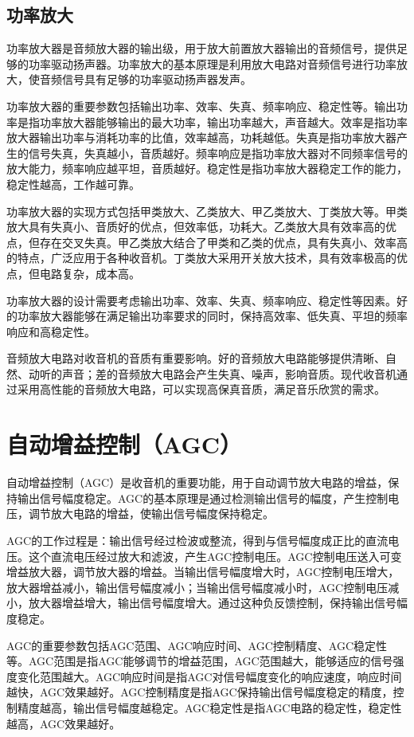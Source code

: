 \documentclass[12pt,UTF8]{ctexbook}
\begin{document}
\subsection{功率放大}

功率放大器是音频放大器的输出级，用于放大前置放大器输出的音频信号，提供足够的功率驱动扬声器。功率放大的基本原理是利用放大电路对音频信号进行功率放大，使音频信号具有足够的功率驱动扬声器发声。

功率放大器的重要参数包括输出功率、效率、失真、频率响应、稳定性等。输出功率是指功率放大器能够输出的最大功率，输出功率越大，声音越大。效率是指功率放大器输出功率与消耗功率的比值，效率越高，功耗越低。失真是指功率放大器产生的信号失真，失真越小，音质越好。频率响应是指功率放大器对不同频率信号的放大能力，频率响应越平坦，音质越好。稳定性是指功率放大器稳定工作的能力，稳定性越高，工作越可靠。

功率放大器的实现方式包括甲类放大、乙类放大、甲乙类放大、丁类放大等。甲类放大具有失真小、音质好的优点，但效率低，功耗大。乙类放大具有效率高的优点，但存在交叉失真。甲乙类放大结合了甲类和乙类的优点，具有失真小、效率高的特点，广泛应用于各种收音机。丁类放大采用开关放大技术，具有效率极高的优点，但电路复杂，成本高。

功率放大器的设计需要考虑输出功率、效率、失真、频率响应、稳定性等因素。好的功率放大器能够在满足输出功率要求的同时，保持高效率、低失真、平坦的频率响应和高稳定性。

音频放大电路对收音机的音质有重要影响。好的音频放大电路能够提供清晰、自然、动听的声音；差的音频放大电路会产生失真、噪声，影响音质。现代收音机通过采用高性能的音频放大电路，可以实现高保真音质，满足音乐欣赏的需求。

\section{自动增益控制（AGC）}

自动增益控制（AGC）是收音机的重要功能，用于自动调节放大电路的增益，保持输出信号幅度稳定。AGC的基本原理是通过检测输出信号的幅度，产生控制电压，调节放大电路的增益，使输出信号幅度保持稳定。

AGC的工作过程是：输出信号经过检波或整流，得到与信号幅度成正比的直流电压。这个直流电压经过放大和滤波，产生AGC控制电压。AGC控制电压送入可变增益放大器，调节放大器的增益。当输出信号幅度增大时，AGC控制电压增大，放大器增益减小，输出信号幅度减小；当输出信号幅度减小时，AGC控制电压减小，放大器增益增大，输出信号幅度增大。通过这种负反馈控制，保持输出信号幅度稳定。

AGC的重要参数包括AGC范围、AGC响应时间、AGC控制精度、AGC稳定性等。AGC范围是指AGC能够调节的增益范围，AGC范围越大，能够适应的信号强度变化范围越大。AGC响应时间是指AGC对信号幅度变化的响应速度，响应时间越快，AGC效果越好。AGC控制精度是指AGC保持输出信号幅度稳定的精度，控制精度越高，输出信号幅度越稳定。AGC稳定性是指AGC电路的稳定性，稳定性越高，AGC效果越好。
\end{document}
